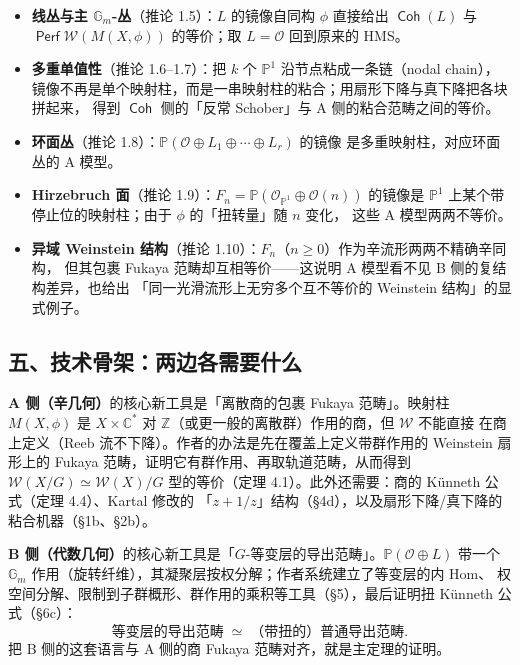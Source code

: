 \documentclass[11pt,a4paper]{article}
\DeclareMathOperator{\Coh}{\mathsf{Coh}}
\DeclareMathOperator{\Perf}{\mathsf{Perf}}
\theoremstyle{cnth}
\begin{document}
\begin{itemize}
\item \textbf{线丛与主 $\mathbb{G}_m$-丛}（推论 1.5）：$L$ 的镜像自同构 $\phi$ 直接给出
      $\Coh(L)$ 与 $\Perf\mathcal{W}(M(X,\phi))$ 的等价；取 $L=\mathcal{O}$ 回到原来的 HMS。
\item \textbf{多重单值性}（推论 1.6–1.7）：把 $k$ 个 $\mathbb{P}^1$ 沿节点粘成一条链（nodal chain），
      镜像不再是单个映射柱，而是一串映射柱的粘合；用扇形下降与真下降把各块拼起来，
      得到 $\Coh$ 侧的「反常 Schober」与 A 侧的粘合范畴之间的等价。
\item \textbf{环面丛}（推论 1.8）：$\mathbb{P}(\mathcal{O}\oplus L_1\oplus\cdots\oplus L_r)$ 的镜像
      是多重映射柱，对应环面丛的 A 模型。
\item \textbf{Hirzebruch 面}（推论 1.9）：$F_n=\mathbb{P}(\mathcal{O}_{\mathbb{P}^1}\oplus\mathcal{O}(n))$
      的镜像是 $\mathbb{P}^1$ 上某个带停止位的映射柱；由于 $\phi$ 的「扭转量」随 $n$ 变化，
      这些 A 模型两两不等价。
\item \textbf{异域 Weinstein 结构}（推论 1.10）：$F_n$（$n\ge0$）作为辛流形两两不精确辛同构，
      但其包裹 Fukaya 范畴却互相等价——这说明 A 模型看不见 B 侧的复结构差异，也给出
      「同一光滑流形上无穷多个互不等价的 Weinstein 结构」的显式例子。
\end{itemize}

\subsection*{五、技术骨架：两边各需要什么}

\textbf{A 侧（辛几何）}的核心新工具是「离散商的包裹 Fukaya 范畴」。映射柱 $M(X,\phi)$ 是
$X\times\mathbb{C}^*$ 对 $\mathbb{Z}$（或更一般的离散群）作用的商，但 $\mathcal{W}$ 不能直接
在商上定义（Reeb 流不下降）。作者的办法是先在覆盖上定义带群作用的 Weinstein 扇形上的
Fukaya 范畴，证明它有群作用、再取轨道范畴，从而得到 $\mathcal{W}(X/G)\simeq\mathcal{W}(X)/G$
型的等价（定理 4.1）。此外还需要：商的 Künneth 公式（定理 4.4）、Kartal 修改的
「$z+1/z$」结构（§4d），以及扇形下降/真下降的粘合机器（§1b、§2b）。

\textbf{B 侧（代数几何）}的核心新工具是「$G$-等变层的导出范畴」。$\mathbb{P}(\mathcal{O}\oplus L)$
带一个 $\mathbb{G}_m$ 作用（旋转纤维），其凝聚层按权分解；作者系统建立了等变层的内 Hom、
权空间分解、限制到子群概形、群作用的乘积等工具（§5），最后证明扭 Künneth 公式（§6c）：
\[
  \text{等变层的导出范畴}\;\simeq\;\text{（带扭的）普通导出范畴}.
\]
把 B 侧的这套语言与 A 侧的商 Fukaya 范畴对齐，就是主定理的证明。
\end{document}
